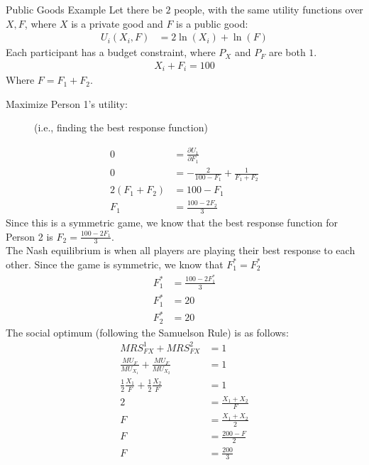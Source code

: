 \documentclass[8pt]{extarticle}
\begin{document}
  \begin{problem}{Public Goods Example}
    Let there be $2$ people, with the same utility functions over $X,F$, where $X$ is a private good and $F$ is a public good:
    \begin{align*}
      U_i(X_i,F) &= 2\ln(X_i) + \ln(F)\tag*{for $i=1,2$}
    \end{align*}
    Each participant has a budget constraint, where $P_X$ and $P_F$ are both $1$.
    \begin{align*}
      X_i + F_i = 100\tag*{for $i=1,2$}
    \end{align*}
    Where $F = F_1 + F_2$.
    \begin{description}
      \item[Maximize Person 1's utility:] (i.e., finding the best response function)
    \end{description}
    \begin{align*}
      0 &= \frac{\partial U_1}{\partial F_1}\\
      0 &= -\frac{2}{100-F_1} + \frac{1}{F_1 + F_2}\tag*{recall that $X_1 = 100-F_1$}\\
      2(F_1 + F_2) &= 100-F_1\\
      F_1 &= \frac{100-2F_2}{3}
    \end{align*}
    Since this is a symmetric game, we know that the best response function for Person 2 is $F_2 = \frac{100-2F_1}{3}$.\\

    The Nash equilibrium is when all players are playing their best response to each other. Since the game is symmetric, we know that $F_1^* = F_2^*$
    \begin{align*}
      F_1^* &= \frac{100-2F_1^*}{3}\\
      F_1^* &= 20\\
      F_2^* &= 20
    \end{align*}
    The social optimum (following the Samuelson Rule) is as follows:
    \begin{align*}
      MRS_{FX}^1 + MRS_{FX}^2 &= 1\\
      \frac{MU_F}{MU_{X_1}} + \frac{MU_F}{MU_{X_2}}  &= 1\\
      \frac{1}{2}\frac{X_1}{F} + \frac{1}{2}\frac{X_2}{F} &= 1\\
      2 &= \frac{X_1 + X_2}{F}\\
      F &= \frac{X_1 + X_2}{2}\\
      F &= \frac{200-F}{2}\\
      F &= \frac{200}{3}
    \end{align*}
  \end{problem}
\end{document}
